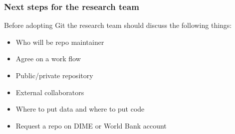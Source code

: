 \documentclass[aspectratio=169]{beamer} %
\begin{document}
\begin{frame}
\frametitle{Next steps for the research team}

	Before adopting Git the research team should discuss the following things:

	\begin{itemize}
		\item Who will be repo maintainer
		\item Agree on a work flow
		\item Public/private repository
		\item External collaborators
		\item Where to put data and where to put code
		\item Request a repo on DIME or World Bank account
	\end{itemize}

\end{frame}




\end{document}
